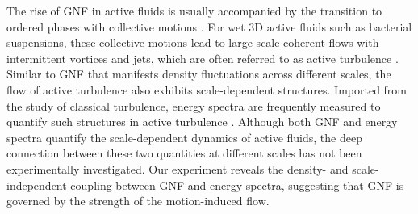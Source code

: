 \documentclass[twocolumn,aps,prx,amsmath,amssymb,longbibliography]{revtex4-2}
\begin{document}
The rise of GNF in active fluids is usually accompanied by the transition to ordered phases with collective motions \cite{Ramaswamy2010,Marchetti2013}. For wet 3D active fluids such as bacterial suspensions, these collective motions lead to large-scale coherent flows with intermittent vortices and jets, which are often referred to as active turbulence \cite{Wolgemuth2008,Wensink2012,Dunkel2013a,Bratanov2015,Guo2018,Linkmann2019,Bardfalvy2019,Alert2020,Skultety2020,Peng2020}. Similar to GNF that manifests density fluctuations across different scales, the flow of active turbulence also exhibits scale-dependent structures. Imported from the study of classical turbulence, energy spectra are frequently measured to quantify such structures in active turbulence \cite{Ishikawa2011,Wensink2012,Dunkel2013a,Giomi2015,Creppy2015,Patteson2018,Alert2020}. Although both GNF and energy spectra quantify the scale-dependent dynamics of active fluids, the deep connection between these two quantities at different scales has not been experimentally investigated. Our experiment reveals the density- and scale- independent coupling between GNF and energy spectra, suggesting that GNF is governed by the strength of the motion-induced flow.

\end{document}
